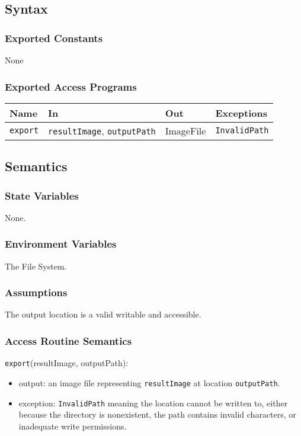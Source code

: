 \documentclass[12pt, titlepage]{article}
\newcommand{\code}[1]{\texttt{#1}}
\begin{document}
\subsection{Syntax}

\subsubsection{Exported Constants}
None

\subsubsection{Exported Access Programs}

\begin{center}
\begin{tabular}{p{2cm} p{4cm} p{4cm} p{2cm}}
\hline
\textbf{Name} & \textbf{In} & \textbf{Out} & \textbf{Exceptions} \\
\hline
\code{export} & \code{resultImage}, \code{outputPath} & ImageFile & \code{InvalidPath} \\
\hline
\end{tabular}
\end{center}

\subsection{Semantics}

\subsubsection{State Variables}
None.

\subsubsection{Environment Variables}
The File System.

\subsubsection{Assumptions}
The output location is a valid writable and accessible. 

\subsubsection{Access Routine Semantics}

\noindent \code{export}(resultImage, outputPath):
\begin{itemize}
\item output: an image file representing \code{resultImage} at location \code{outputPath}. 
\item exception: \code{InvalidPath} meaning the location cannot be written to, either because
  the directory is nonexistent, the path contains invalid characters, or inadequate write permissions.
\end{itemize}
\end{document}
